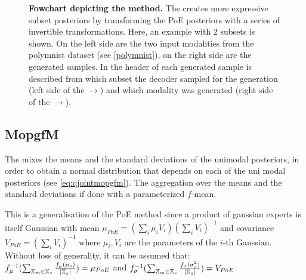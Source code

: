 \begin{figure}[h!]
    \centering
    \caption{\textbf{Fowchart depicting the  method.} The  creates more expressive subset posteriors by transforming the PoE posteriors with a series of invertible transformations.
    Here, an example with 2 subsets is shown. On the left side are the two input modalities from the polymnist dataset (see \cref{polymnist}), on the right side are the generated samples.
    In the header of each generated sample is described from which subset the decoder sampled for the generation (left side of the $\rightarrow$) and which modality was generated (right side of the $\rightarrow$).}
    \label{fig:mofopoe}
\end{figure}


\subsection{MopgfM}\label{subsec:mopgfm}
The  mixes the means and the standard deviations of the unimodal posteriors, in order to obtain a normal distribution that depends on each of the uni modal posteriors (see \cref{eq:qjointmopgfm}).
The aggregation over the means and the standard deviations if done with a parameterized $f$-mean.

\smallskip

This is a generalisation of the PoE method since a product of gaussian experts is itself Gaussian with mean $\mu_{PoE} = (\sum _i \mu _i V_i)(\sum _i V_i)^{-1}$ and covariance $V_{PoE}= (\sum _i V_i)^{-1}$ where $\mu _i, V_i$ are the parameters of the $i$-th Gaussian.\\
Without loss of generality, it can be assumed that:\\
$f_{\mu}^{-1}(\sum _{\mathbb{X}_m \in \mathbb{X}_s} \frac{f_{\mu}(\mu_s)}{|\mathbb{X}_s|}) = \mu_{PoE}$ and $f_{\sigma}^{-1}(\sum  _{\mathbb{X}_m \in \mathbb{X}_s} \frac{f_{\sigma}(\sigma_s^2)}{|\mathbb{X}_s|}) = V_{PoE}$.

\smallskip

